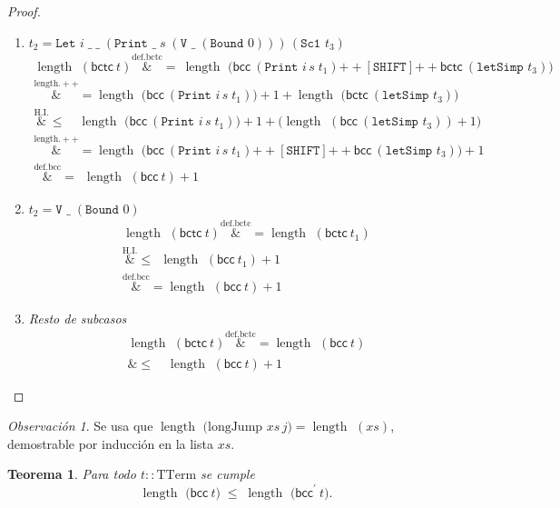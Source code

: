 \documentclass[12pt]{article}
\newcommand{\length}{\operatorname{length\  }}
\newcommand{\bcc}[1]{\mathsf{bcc}\ #1}
\newcommand{\bctc}[1]{\mathsf{bctc}\ #1}
\newcommand{\concat}{\mathbin{+\!\!+}}   %
\newtheorem{theorem}{Teorema}
\theoremstyle{remark}
\newtheorem*{remark}{Observación}
\newcommand{\bccp}[1]{\mathsf{bcc}^{\prime}\ #1}
\newcommand{\overeqa}[1]{\overset{\mathrm{#1}}&{=}}
\newcommand{\overlea}[1]{\overset{\mathrm{#1}}&{\le}}
\begin{document}
\begin{proof}
\begin{enumerate}[label=\textbf{(\alph*)},wide,topsep=4pt]
\begin{enumerate}[label=\textbf{(\roman*)}, leftmargin=6em]
  \item $t_2=\texttt{Let }i\;\_\;\_\;(\texttt{Print }\_\;s\;(\texttt{V }\_\;(\texttt{Bound }0)))\,(\texttt{Sc1 }t_3)$
  \begin{align*}
  \length(\bctc{t})
     \overeqa{def.bctc} \ \length\!\bigl(
         \bcc{(\texttt{Print }i\,s\;t_1)}\concat
         [\texttt{SHIFT}]\concat
         \bctc{(\texttt{letSimp }t_3)}
       \bigr) \\
     \overeqa{length.++} \length\!\bigl(\bcc{(\texttt{Print }i\,s\;t_1)}\bigr)+1+
       \length\!\bigl(\bctc{(\texttt{letSimp }t_3)}\bigr)        \\
     \overlea{H.I.} \quad \length\!\bigl(\bcc{(\texttt{Print }i\,s\;t_1)}\bigr)+1+
        \bigl(\length(\bcc{(\texttt{letSimp }t_3)})+1\bigr)      \\
     \overeqa{length.++} \length\!\bigl(
         \bcc{(\texttt{Print }i\,s\;t_1)}\concat
         [\texttt{SHIFT}]\concat
         \bcc{(\texttt{letSimp }t_3)} 
       \bigr) + 1\\
     \overeqa{def.bcc} \ \  \length(\bcc{t})+1
  \end{align*}

  \item $t_2=\texttt{V }\_\;(\texttt{Bound }0)$
  \begin{align*}
        \length(\bctc{t}) \overeqa{def.bctc} \length(\bctc{t_1}) \\ 
        \overlea{H.I.} \ \  \length(\bcc{t_1})+1 \\
        \overeqa{def.bcc} \length(\bcc{t})+1
  \end{align*}


  \item \emph{Resto de subcasos}  
        \begin{align*}
            \length(\bctc{t}) \overeqa{def.bctc} \length(\bcc{t}) \\
            \overlea{} \quad \length(\bcc{t}) + 1
        \end{align*}
\end{enumerate}
\end{enumerate}

\end{proof}

\begin{remark}
Se usa que  
$\length\bigl(\text{longJump }xs\,j\bigr)=\length(xs)$,  
demostrable por inducción en la lista $xs$.
\end{remark}

\begin{theorem}
Para todo $t :: \mathrm{TTerm}$ se cumple
\[
  \length\!\bigl(\bcc{t}\bigr)\;\le\;
  \length\!\bigl(\bccp{t}\bigr).
\]
\end{theorem}
\end{document}
